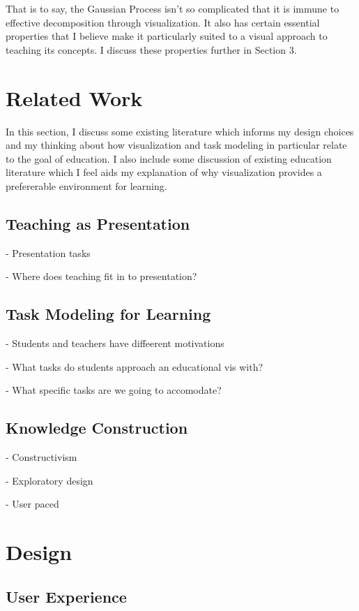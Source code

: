 \documentclass{vgtc}                          %
\begin{document}
That is to say, the Gaussian Process isn't so complicated that it is immune to
effective decomposition through visualization. It also has certain essential
properties that I believe make it particularly suited to a visual approach to
teaching its concepts. I discuss these properties further in Section 3.

\section{Related Work}

In this section, I discuss some existing literature which informs my design
choices and my thinking about how visualization and task modeling in particular
relate to the goal of education. I also include some discussion of existing
education literature which I feel aids my explanation of why visualization
provides a prefererable environment for learning.

\subsection{Teaching as Presentation}

- Presentation tasks

- Where does teaching fit in to presentation?

\subsection{Task Modeling for Learning}

- Students and teachers have diffeerent motivations

- What tasks do students approach an educational vis with?

- What specific tasks are we going to accomodate?

\subsection{Knowledge Construction}

- Constructivism

- Exploratory design

- User paced

\section{Design}

\subsection{User Experience}
\end{document}
